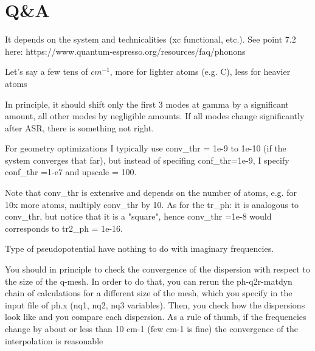 \section{Q\&A}


  It depends on the system and technicalities (xc functional, etc.). See point 7.2 here: https://www.quantum-espresso.org/resources/faq/phonons

  Let's say a few tens of $cm^{-1}$, more for lighter atoms (e.g. C), less for heavier atoms


  In principle, it should shift only the first 3 modes at gamma by a significant amount, all other modes by negligible amounts. If all modes change significantly after ASR, there is something not right.


  For geometry optimizations I typically use conv\_thr = 1e-9 to 1e-10 (if the system converges that far), but instead of specifing conf\_thr=1e-9, I specify conf\_thr =1-e7 and upscale = 100.

  Note that conv\_thr is extensive and depends on the number of atoms, e.g. for 10x more atoms, multiply conv\_thr by 10.
  As for the tr\_ph: it is analogous to conv\_thr, but notice that it is a "square", hence conv\_thr =1e-8 would corresponds to tr2\_ph = 1e-16.

  Type of  pseudopotential have nothing to do with imaginary frequencies.


  You should in principle to check the convergence of the dispersion with respect to the size of the q-mesh. In order to do that, you can rerun the ph-q2r-matdyn chain of calculations for a different size of the mesh, which you specify in the input file of ph.x (nq1, nq2, nq3 variables). Then, you check how the dispersions look like and you compare each dispersion. As a rule of thumb, if the frequencies change by about or less than 10 cm-1 (few cm-1 is fine) the convergence of the interpolation is reasonable

